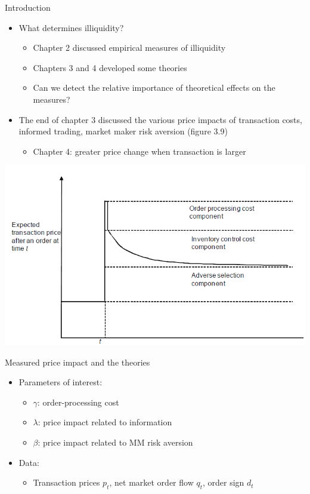 \documentclass[english,10pt
,aspectratio=169
]{beamer}
\begin{document}
\begin{frame}{Introduction}
	\begin{itemize}
		\item What determines illiquidity?
		\begin{itemize}
			\item Chapter 2 discussed empirical measures of illiquidity
			\item Chapters 3 and 4 developed some theories
			\item Can we detect the relative importance of theoretical effects on the measures?
		\end{itemize}
		\item The end of chapter 3 discussed the various price impacts of transaction costs, informed trading, market maker risk aversion (figure 3.9)
		\begin{itemize}
			\item Chapter 4: greater price change when transaction is larger
		\end{itemize}
	\end{itemize}
\end{frame}


\begin{frame}{}
	\includegraphics[width=0.8\linewidth]{pics/PriceDiscovery_Image}
\end{frame}


\begin{frame}{Measured price impact and the theories}
	\begin{itemize}
		\item Parameters of interest:
		\begin{itemize}
			\item $\gamma$: order-processing cost
			\item $\lambda$: price impact related to information
			\item $\beta$: price impact related to MM risk aversion
		\end{itemize}
		\item Data:
		\begin{itemize}
			\item Transaction prices $p_t$, net market order flow $q_t$, order sign $d_t$
		\end{itemize}
	\end{itemize}
\end{frame}
\end{document}
